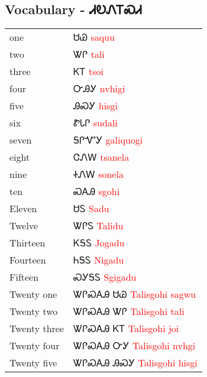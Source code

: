 \begin{multicols}
\newpage\subsection{Vocabulary - ᏗᎧᏁᎢᏍᏗ 
}
\begin{minipage}{\linewidth}
\begin{tabular}{p{5cm} p{9cm}}
one & ᏌᏊ 
 \newline \textcolor{red}{saquu}\\
two & ᏔᎵ 
 \newline \textcolor{red}{tali}\\
three & ᏦᎢ 
 \newline \textcolor{red}{tsoi}\\
four & ᏅᎯᎩ 
 \newline \textcolor{red}{nvhigi}\\
five & ᎯᏍᎩ 
 \newline \textcolor{red}{hisgi}\\
six & ᏑᏓᎵ 
 \newline \textcolor{red}{sudali}\\
seven & ᎦᎵᏉᎩ 
 \newline \textcolor{red}{galiquogi}\\
eight & ᏣᏁᎳ 
 \newline \textcolor{red}{tsanela}\\
nine & ᏐᏁᎳ 
 \newline \textcolor{red}{sonela}\\
ten & ᏍᎪᎯ 
 \newline \textcolor{red}{sgohi}\\
Eleven & ᏌᏚ 
 \newline \textcolor{red}{Sadu}\\
Twelve & ᏔᎵᏚ 
 \newline \textcolor{red}{Talidu}\\
Thirteen & ᏦᎦᏚ 
 \newline \textcolor{red}{Jogadu}\\
Fourteen & ᏂᎦᏚ 
 \newline \textcolor{red}{Nigadu}\\
Fifteen & ᏍᎩᎦᏚ 
 \newline \textcolor{red}{Sgigadu}\\
Twenty one & ᏔᎵᏍᎪᎯ ᏌᏊ 
 \newline \textcolor{red}{Talisgohi sagwu}\\
Twenty two & ᏔᎵᏍᎪᎯ ᏔᎵ 
 \newline \textcolor{red}{Talisgohi tali}\\
Twenty three & ᏔᎵᏍᎪᎯ ᏦᎢ 
 \newline \textcolor{red}{Talisgohi joi}\\
Twenty four & ᏔᎵᏍᎪᎯ ᏅᎩ 
 \newline \textcolor{red}{Talisgohi nvhgi}\\
Twenty five & ᏔᎵᏍᎪᎯ ᎯᏍᎩ 
 \newline \textcolor{red}{Talisgohi hisgi}\\
\end{tabular}
\end{minipage}


\end{multicols}
